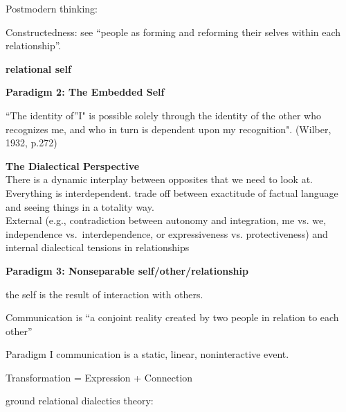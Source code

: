 \documentclass[
]{book}
\begin{document}
Postmodern thinking:

Constructedness: see ``people as forming and reforming their selves
within each relationship''.

\textbf{relational self}

\textbf{Paradigm 2: The Embedded Self}

``The identity of''I" is possible solely through the identity of the
other who recognizes me, and who in turn is dependent upon my
recognition". (Wilber, 1932, p.272)

\textbf{The Dialectical Perspective}\\
There is a dynamic interplay between opposites that we need to look at.
Everything is interdependent. trade off between exactitude of factual
language and seeing things in a totality way.\\
External (e.g., contradiction between autonomy and integration, me vs.
we, independence vs.~interdependence, or expressiveness vs.
protectiveness) and internal dialectical tensions in relationships

\textbf{Paradigm 3: Nonseparable self/other/relationship}

the self is the result of interaction with others.

Communication is ``a conjoint reality created by two people in relation
to each other''

Paradigm I \textbar{} communication is a static, linear, noninteractive event.

Transformation = Expression + Connection

\citep{Baxter_2004}

ground relational dialectics theory:
\end{document}

